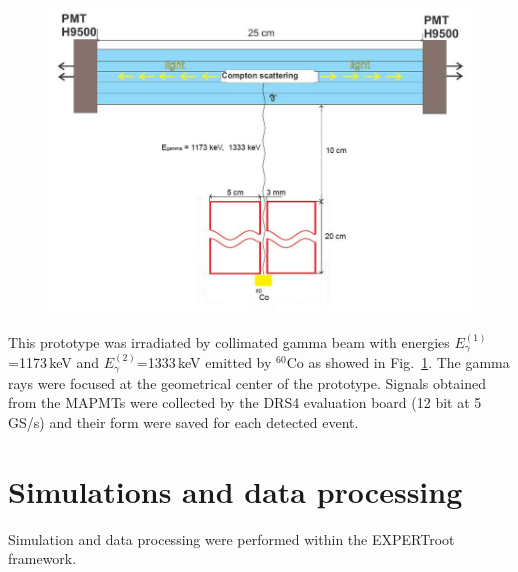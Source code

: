 \documentclass{webofc}
\newcommand{\er}{\textmd{EXPERTroot}}
\begin{document}
\begin{figure}[h]
	\centering
	\includegraphics[width=0.8\linewidth]{NeuRadexperiment.png}
	\label{ris:neuradexp}
\end{figure}

This prototype was irradiated by collimated gamma beam with energies $E^{(1)}_{\gamma}$=1173\,keV and $E^{(2)}_{\gamma}$=1333\,keV emitted by $^{60}$Co as showed in Fig.~\ref{ris:neuradexp}. The gamma rays were focused at the geometrical center of the prototype. Signals obtained from the MAPMTs were collected by the DRS4 evaluation board (12 bit at 5 GS/s) and their form were saved for each detected event.


\section{Simulations and data processing}

Simulation and data processing were performed within the \er\, framework.
\end{document}
